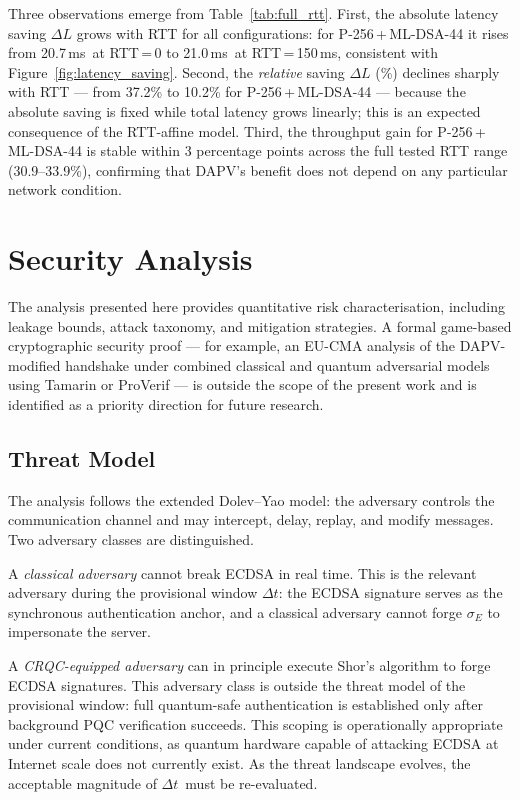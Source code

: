 \documentclass[preprint,10pt,3p]{elsarticle}
\newcommand{\Dt}{\ensuremath{\Delta t}}
\newcommand{\ms}{\,ms}
\begin{document}
Three observations emerge from Table~\ref{tab:full_rtt}.
First, the absolute latency saving $\Delta L$ grows with RTT for all
configurations: for P-256\,+\,ML-DSA-44 it rises from 20.7\ms\ at RTT\,=\,0
to 21.0\ms\ at RTT\,=\,150\ms, consistent with Figure~\ref{fig:latency_saving}.
Second, the \emph{relative} saving $\Delta L$ (\%) declines sharply with RTT
--- from 37.2\% to 10.2\% for P-256\,+\,ML-DSA-44 --- because the absolute
saving is fixed while total latency grows linearly; this is an expected
consequence of the RTT-affine model.
Third, the throughput gain for P-256\,+\,ML-DSA-44 is stable within
3 percentage points across the full tested RTT range (30.9--33.9\%),
confirming that DAPV's benefit does not depend on any particular network
condition.

\section{Security Analysis}
\label{sec:security}

The analysis presented here provides quantitative risk characterisation,
including leakage bounds, attack taxonomy, and mitigation strategies.  A formal
game-based cryptographic security proof --- for example, an EU-CMA analysis of
the DAPV-modified handshake under combined classical and quantum adversarial
models using Tamarin or ProVerif --- is outside the scope of the present work
and is identified as a priority direction for future research.

\subsection{Threat Model}

The analysis follows the extended Dolev--Yao model: the adversary controls the
communication channel and may intercept, delay, replay, and modify messages.
Two adversary classes are distinguished.

A \textit{classical adversary} cannot break ECDSA in real time.  This is the
relevant adversary during the provisional window \Dt: the ECDSA signature serves
as the synchronous authentication anchor, and a classical adversary cannot
forge $\sigma_E$ to impersonate the server.

A \textit{CRQC-equipped adversary} can in principle execute Shor's algorithm to
forge ECDSA signatures.  This adversary class is outside the threat model of
the provisional window: full quantum-safe authentication is established only
after background PQC verification succeeds.  This scoping is operationally
appropriate under current conditions, as quantum hardware capable of attacking
ECDSA at Internet scale does not currently exist.  As the threat landscape
evolves, the acceptable magnitude of \Dt\ must be re-evaluated.
\end{document}
